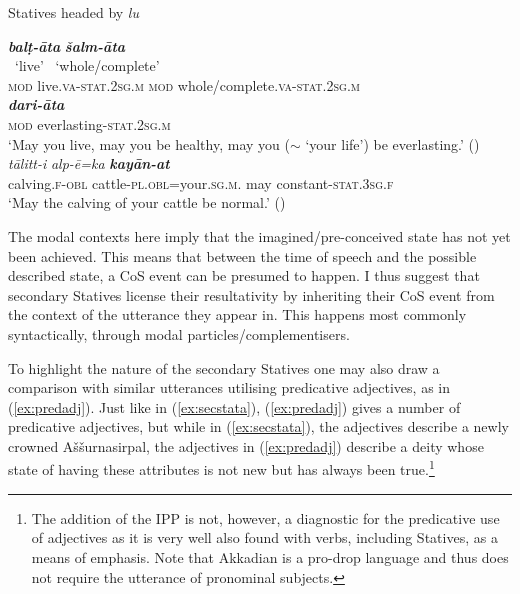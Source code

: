 \documentclass[output=paper,colorlinks,citecolor=brown]{langscibook}
\begin{document}
 \newpage
\begin{exe}  \ex Statives headed by \textit{lu} \label{ex:lu}
\begin{xlist}
    \ex     \glll {} {\textit{\textbf{balṭ-āta}} }  {\textit{\textbf{šalm-āta}} } \\
{} ~`live' {} ~`whole/complete' \\
\textsc{mod} live.\textsc{va-stat.2sg.m} \textsc{mod} whole/complete.\textsc{va-stat.2sg.m} \\
\gll {} {\textit{\textbf{dari-āta}} }\\
\textsc{mod} everlasting-\textsc{stat.2sg.m} \\
    \glt `May you live, may you be healthy, may you ($\sim$ `your life') be everlasting.' ()
    \ex \gll    \textit{tālitt-i} \textit{alp-ē=ka}  {\textit{\textbf{kayān-at}} }\\
     calving.\textsc{f-obl} cattle-\textsc{pl.obl}=your.\textsc{sg.m.} may constant-\textsc{stat.3sg.f}\\
    \glt `May the calving of your cattle be normal.' (\citealt[568, 20]{Sidersky1920})
\end{xlist}
\end{exe}

The modal contexts here imply that the imagined/pre-conceived state has not yet been achieved. This means that between the time of speech and the possible described state, a CoS  event can be presumed to happen. I thus suggest that secondary Statives license their resultativity by inheriting their CoS  event from the context of the utterance they appear in. This happens most commonly syntactically, through modal particles/complementisers.

To highlight the  nature of the secondary Statives one may also draw a comparison with similar utterances utilising predicative adjectives, as in (\ref{ex:predadj}). Just like in (\ref{ex:secstata}), (\ref{ex:predadj}) gives a number of predicative adjectives, but while in (\ref{ex:secstata}), the adjectives describe a newly crowned Aššurnasirpal, the adjectives in (\ref{ex:predadj}) describe a deity whose state of having these attributes is not new but has always been true.\footnote{The addition of the IPP  is not, however, a diagnostic for the predicative use of adjectives as it is very well also found with verbs, including Statives, as a means of emphasis. Note that Akkadian is a pro-drop language and thus does not require the utterance of pronominal subjects.}
\end{document}
